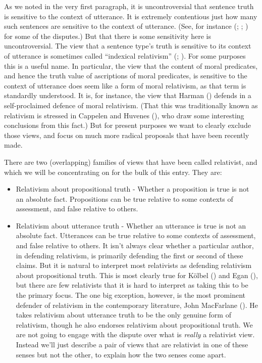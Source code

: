 \documentclass[
  11pt,
  letterpaper,
  DIV=11,
  numbers=noendperiod,
  twoside]{scrartcl}
\providecommand{\tightlist}{%
  \setlength{\itemsep}{0pt}\setlength{\parskip}{0pt}}
\begin{document}
As we noted in the very first paragraph, it is uncontroversial that
sentence truth is sensitive to the context of utterance. It is extremely
contentious just how many such sentences are sensitive to the context of
utterance. (See, for instance (;
;
) for some of the
disputes.) But that there is some sensitivity here is uncontroversial.
The view that a sentence type's truth is sensitive to its context of
utterance is sometimes called ``indexical relativism''
(;
). For some purposes this is
a useful name. In particular, the view that the content of moral
predicates, and hence the truth value of ascriptions of moral
predicates, is sensitive to the context of utterance does seem like a
form of moral relativism, as that term is standardly understood. It is,
for instance, the view that Harman ()
defends in a self-proclaimed defence of moral relativism. (That this was
traditionally known as relativism is stressed in Cappelen and Huvenes
(), who draw some interesting
conclusions from this fact.) But for present purposes we want to clearly
exclude those views, and focus on much more radical proposals that have
been recently made.

There are two (overlapping) families of views that have been called
relativist, and which we will be concentrating on for the bulk of this
entry. They are:

\begin{itemize}
\tightlist
\item
  Relativism about propositional truth - Whether a proposition is true
  is not an absolute fact. Propositions can be true relative to some
  contexts of assessment, and false relative to others.
\item
  Relativism about utterance truth - Whether an utterance is true is not
  an absolute fact. Utterances can be true relative to some contexts of
  assessment, and false relative to others. It isn't always clear
  whether a particular author, in defending relativism, is primarily
  defending the first or second of these claims. But it is natural to
  interpret most relativists as defending relativism about propositional
  truth. This is most clearly true for Kölbel
  () and Egan
  (), but there are few relativists
  that it is hard to interpret as taking this to be the primary focus.
  The one big exception, however, is the most prominent defender of
  relativism in the contemporary literature, John MacFarlane
  (). He takes relativism about
  utterance truth to be the only genuine form of relativism, though he
  also endorses relativism about propositional truth. We are not going
  to engage with the dispute over what is \emph{really} a relativist
  view. Instead we'll just describe a pair of views that are relativist
  in one of these senses but not the other, to explain how the two
  senses come apart.
\end{itemize}
\end{document}
